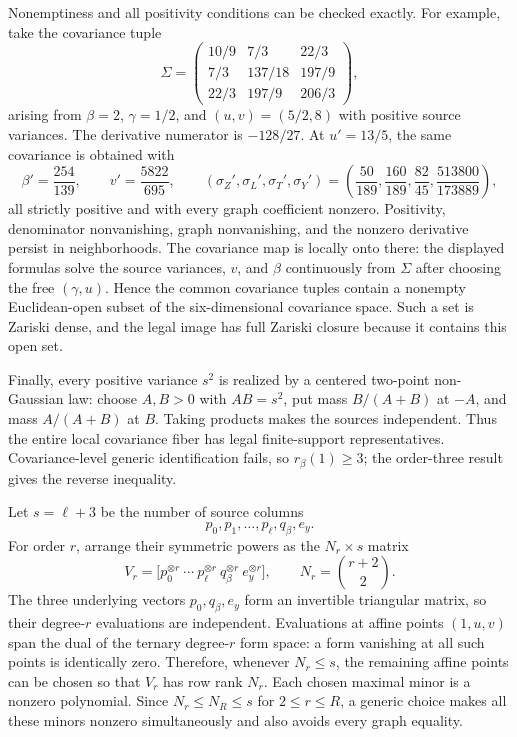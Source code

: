 Nonemptiness and all positivity conditions can be checked exactly.  For example, take the covariance tuple
\[
 \Sigma=
 \begin{pmatrix}
 10/9&7/3&22/3\\
 7/3&137/18&197/9\\
 22/3&197/9&206/3
 \end{pmatrix},
\]
arising from \(\beta=2\), \(\gamma=1/2\), and \((u,v)=(5/2,8)\) with positive source variances.  The derivative numerator is \(-128/27\).  At \(u'=13/5\), the same covariance is obtained with
\[
 \beta'=\frac{254}{139},\qquad
 v'=\frac{5822}{695},\qquad
 (\sigma_Z',\sigma_L',\sigma_T',\sigma_Y')
 =\left(\frac{50}{189},\frac{160}{189},\frac{82}{45},
 \frac{513800}{173889}\right),
\]
all strictly positive and with every graph coefficient nonzero.  Positivity, denominator nonvanishing, graph nonvanishing, and the nonzero derivative persist in neighborhoods.  The covariance map is locally onto there: the displayed formulas solve the source variances, \(v\), and \(\beta\) continuously from \(\Sigma\) after choosing the free \((\gamma,u)\).  Hence the common covariance tuples contain a nonempty Euclidean-open subset of the six-dimensional covariance space.  Such a set is Zariski dense, and the legal image has full Zariski closure because it contains this open set.

Finally, every positive variance \(s^2\) is realized by a centered two-point non-Gaussian law: choose \(A,B>0\) with \(AB=s^2\), put mass \(B/(A+B)\) at \(-A\), and mass \(A/(A+B)\) at \(B\).  Taking products makes the sources independent.  Thus the entire local covariance fiber has legal finite-support representatives.  Covariance-level generic identification fails, so \(r_\beta(1)\ge3\); the order-three result gives the reverse inequality.

Let \(s=\ell+3\) be the number of source columns
\[
 p_0,p_1,\ldots,p_\ell,q_\beta,e_y.
\]
For order \(r\), arrange their symmetric powers as the \(N_r\times s\) matrix
\[
 V_r=\bigl[p_0^{\otimes r}\ \cdots\ p_\ell^{\otimes r}\ q_\beta^{\otimes r}\ e_y^{\otimes r}\bigr],
 \qquad N_r=\binom{r+2}{2}.
\]
The three underlying vectors \(p_0,q_\beta,e_y\) form an invertible triangular matrix, so their degree-\(r\) evaluations are independent.  Evaluations at affine points \((1,u,v)\) span the dual of the ternary degree-\(r\) form space: a form vanishing at all such points is identically zero.  Therefore, whenever \(N_r\le s\), the remaining affine points can be chosen so that \(V_r\) has row rank \(N_r\).  Each chosen maximal minor is a nonzero polynomial.  Since \(N_r\le N_R\le s\) for \(2\le r\le R\), a generic choice makes all these minors nonzero simultaneously and also avoids every graph equality.

